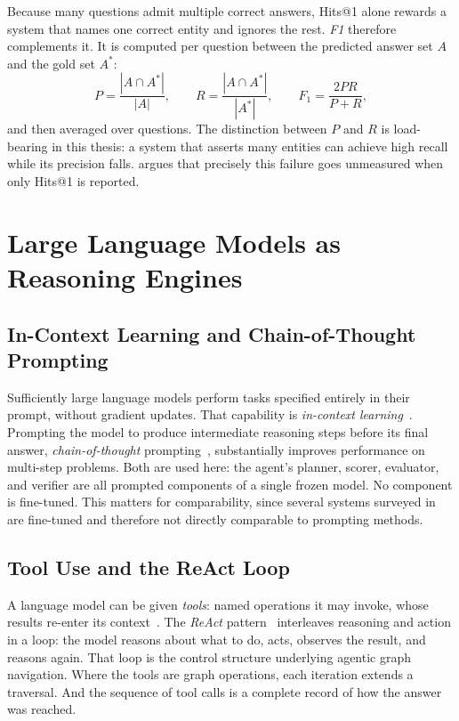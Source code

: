 Because many questions admit multiple correct answers, Hits@1 alone rewards a
system that names one correct entity and ignores the rest. \emph{F1} therefore
complements it. It is computed per question between the predicted answer set
$A$ and the gold set $A^{*}$: \[ P = \frac{|A \cap A^{*}|}{|A|}, \qquad R =
\frac{|A \cap A^{*}|}{|A^{*}|}, \qquad F_1 = \frac{2PR}{P + R}, \] and then
averaged over questions. The distinction between $P$ and $R$ is load-bearing in
this thesis: a system that asserts many entities can achieve high recall while
its precision falls.  argues that precisely this failure
goes unmeasured when only Hits@1 is reported.

\section{Large Language Models as Reasoning Engines}\label{sec:llms}

\subsection{In-Context Learning and Chain-of-Thought Prompting}

Sufficiently large language models perform tasks specified entirely in their
prompt, without gradient updates. That capability is \emph{in-context
learning}~\cite{brown2020language}. Prompting the
model to produce intermediate reasoning steps before its final answer,
\emph{chain-of-thought} prompting~\cite{wei2022chain}, substantially improves
performance on multi-step problems. Both are used here: the agent's planner,
scorer, evaluator, and verifier are all prompted components of a single frozen
model. No component is fine-tuned. This matters for comparability, since
several systems surveyed in  are fine-tuned and therefore not
directly comparable to prompting methods.

\subsection{Tool Use and the ReAct Loop}

A language model can be given \emph{tools}: named operations it may invoke,
whose results re-enter its context~\cite{schick2023toolformer}. The
\emph{ReAct} pattern~\cite{yao2023react} interleaves reasoning and
action in a loop: the model reasons about what to do, acts, observes the
result, and reasons again. That loop is the control structure underlying
agentic graph navigation. Where the tools are graph operations, each iteration
extends a traversal. And the sequence of tool calls is a complete record of how
the answer was reached.

